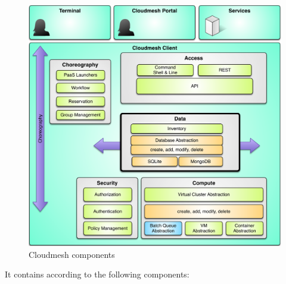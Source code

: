 \begin{figure}[htb]
  \centering
      \includegraphics[width=1.0\columnwidth]{images/cloudmesh-arch-2.pdf}
  \caption{Cloudmesh components} 
  \label{F:NIST-arch}
\end{figure}

It contains according to \cite{nist-bd} the following components:

